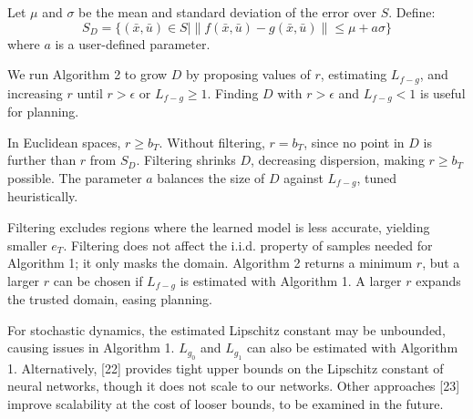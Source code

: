 \documentclass{article}
\begin{document}
Let \( \mu \) and \( \sigma \) be the mean and standard deviation of the error over \( S \). Define:
\[
S_D = \{(\bar{x}, \bar{u}) \in S \mid \|f(\bar{x}, \bar{u}) - g(\bar{x}, \bar{u})\| \leq \mu + a\sigma\}
\]
where \( a \) is a user-defined parameter.

We run Algorithm 2 to grow \( D \) by proposing values of \( r \), estimating \( L_{f-g} \), and increasing \( r \) until \( r > \epsilon \) or \( L_{f-g} \geq 1 \). Finding \( D \) with \( r > \epsilon \) and \( L_{f-g} < 1 \) is useful for planning.

In Euclidean spaces, \( r \geq b_T \). Without filtering, \( r = b_T \), since no point in \( D \) is further than \( r \) from \( S_D \). Filtering shrinks \( D \), decreasing dispersion, making \( r \geq b_T \) possible. The parameter \( a \) balances the size of \( D \) against \( L_{f-g} \), tuned heuristically.

Filtering excludes regions where the learned model is less accurate, yielding smaller \( e_T \). Filtering does not affect the i.i.d. property of samples needed for Algorithm 1; it only masks the domain. Algorithm 2 returns a minimum \( r \), but a larger \( r \) can be chosen if \( L_{f-g} \) is estimated with Algorithm 1. A larger \( r \) expands the trusted domain, easing planning.

For stochastic dynamics, the estimated Lipschitz constant may be unbounded, causing issues in Algorithm 1. \( L_{g_0} \) and \( L_{g_1} \) can also be estimated with Algorithm 1. Alternatively, [22] provides tight upper bounds on the Lipschitz constant of neural networks, though it does not scale to our networks. Other approaches [23] improve scalability at the cost of looser bounds, to be examined in the future.
\end{document}
